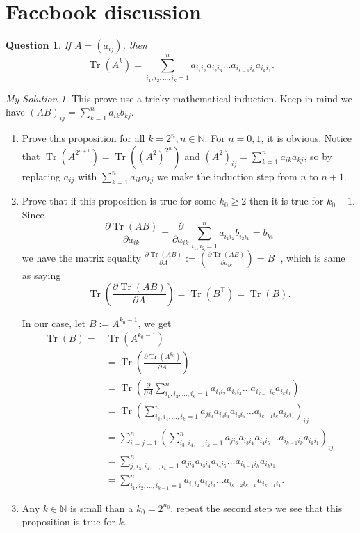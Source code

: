 \documentclass[]{article}
\newtheorem{prop}{Question}
\theoremstyle{remark}
\newtheorem*{sol}{My Solution}
\begin{document}
\section{Facebook discussion}
\begin{prop}
	 If $ A= (a_{ij}) $, then \[ \operatorname{Tr}\left(A^{k}\right)=\sum_{i_1, i_2, \ldots, i_{k}=1}^{n} a_{i_1 i_2} a_{i_2 i_3} \ldots a_{i_{k-1} i_{k}} a_{i_{k} i_1}. \]
\end{prop}
\begin{sol}
	This prove use a tricky mathematical induction. Keep in mind we have $ (AB)_{ij} =\sum_{k=1}^{n} a_{i k} b_{k j} $.
	\begin{enumerate}
		\item Prove this proposition for all $ k=2^n, n\in \mathbb{N} $. For $ n=0,1 $, it is obvious. Notice that $ \operatorname{Tr}\left(A^{2^{n+1}}\right) = \operatorname{Tr}\left((A^2)^{2^n}\right) $ and  $\left(A^{2}\right)_{i j}=\sum_{k=1}^{n} a_{i k} a_{k j}$, so by replacing $ a_{ij} $ with $ \sum_{k=1}^{n} a_{i k} a_{k j} $ we make the induction step from $ n $ to $ n+1 $.
		\item Prove that if this proposition is true for some $ k_0 \ge 2 $ then it is true for $ k_0 -1 $. Since
		\[ \frac{\partial\operatorname{Tr}(AB)}{\partial a_{ik} } =\frac{\partial}{\partial a_{ik}}\sum_{i_1,i_2=1}^{n}a_{i_1 i_2} b_{i_2 i_1}  = b_{ki} \]
		we have the matrix equality $ \frac{\partial\operatorname{Tr}(AB)}{\partial A } :=( \frac{\partial\operatorname{Tr}(AB)}{\partial a_{ik} }) = B^\intercal$, which is same as saying
		\[ \operatorname{Tr}\left( \frac{\partial\operatorname{Tr}(AB)}{\partial A } \right) =\operatorname{Tr}(B^\intercal)=\operatorname{Tr}(B).
		\]

		In our case, let $ B:=A^{k_0 -1} $, we get
		\begin{align*}
			\operatorname{Tr}(B) = & \operatorname{Tr}(A^{k_0 -1})\\
			&=\operatorname{Tr}\left( \frac{\partial\operatorname{Tr}(A^{k_0})}{\partial A } \right)\\
			&=\operatorname{Tr}\left( \frac{\partial}{\partial A } \sum_{i_1, i_2, \ldots, i_{k}=1}^{n} a_{i_1 i_2} a_{i_2 i_3} \ldots a_{i_{k-1} i_{k}} a_{i_{k} i_1}\right)\\
			&=\operatorname{Tr} \left( \sum_{i_3, i_4, \ldots, i_{k}=1}^{n} a_{j i_3}a_{i_3 i_4} a_{i_4 i_5} \ldots a_{i_{k-1} i_{k}} a_{i_{k} i_1}\right) _{ij}\\
			&= \sum_{i=j=1}^{n}\left( \sum_{i_3, i_4, \ldots, i_{k}=1}^{n} a_{j i_3}a_{i_3 i_4} a_{i_4 i_5} \ldots a_{i_{k-1} i_{k}} a_{i_{k} i_1}\right) _{ij}\\
			&=\sum_{j,i_3, i_4, \ldots, i_{k}=1}^{n} a_{j i_3}a_{i_3 i_4} a_{i_4 i_5} \ldots a_{i_{k-1} i_{k}} a_{i_{k} i_1}\\
			&= \sum_{i_1, i_2, \ldots, i_{k-1}=1}^{n} a_{i_1 i_2} a_{i_2 i_3} \ldots a_{i_{k-2} i_{k-1}} a_{i_{k-1} i_1}.
		\end{align*}
		\item Any $ k\in \mathbb{N} $ is small than a $ k_0 = 2^{n_0} $, repeat the second step we see that this proposition is true for $ k $.
	\end{enumerate}
\end{sol}
\end{document}
